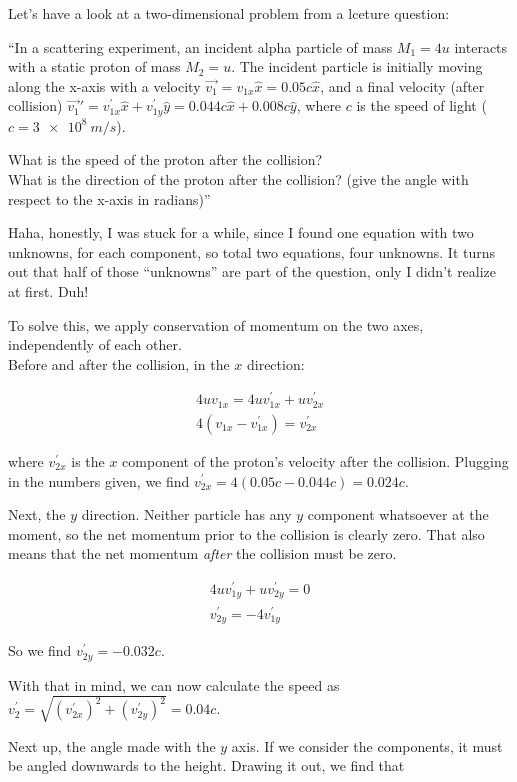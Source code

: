 \documentclass[12pt,a4paper]{report}
\begin{document}
Let's have a look at a two-dimensional problem from a lceture question:

``In a scattering experiment, an incident alpha particle of mass $M_1 = 4u$ interacts with a static proton of mass $M_2 = u$. The incident particle is initially moving along the x-axis with a velocity $\vec{v_1} = v_{1x} \hat{x} = 0.05 c \hat{x}$, and a final velocity (after collision) $\vec{v_1}' = v_{1x}^{'} \hat{x} + v_{1y}^{'} \hat{y} = 0.044 c \hat{x} + 0.008 c \hat{y}$, where $c$ is the speed of light ($c = \SI{3e8}{m/s}$).

What is the speed of the proton after the collision?\\
What is the direction of the proton after the collision? (give the angle with respect to the x-axis in radians)''

Haha, honestly, I was stuck for a while, since I found one equation with two unknowns, for each component, so total two equations, four unknowns. It turns out that half of those ``unknowns'' are part of the question, only I didn't realize at first. Duh!

To solve this, we apply conservation of momentum on the two axes, independently of each other.\\
Before and after the collision, in the $x$ direction:

\begin{align}
4 u v_{1x} = 4 u v_{1x}^{'} + u v_{2x}^{'}\\
4 (v_{1x} - v_{1x}^{'}) = v_{2x}^{'}
\end{align}

where $v_{2x}^{'}$ is the $x$ component of the proton's velocity after the collision. Plugging in the numbers given, we find $v_{2x}^{'} = 4(0.05c - 0.044c) = 0.024c$.

Next, the $y$ direction. Neither particle has any $y$ component whatsoever at the moment, so the net momentum prior to the collision is clearly zero. That also means that the net momentum \emph{after} the collision must be zero.

\begin{align}
4 u v_{1y}^{'} + u v_{2y}^{'} = 0\\
v_{2y}^{'} = -4 v_{1y}^{'}
\end{align}

So we find $v_{2y}^{'} = -0.032c$.

With that in mind, we can now calculate the speed as $v_2^{'} = \sqrt{(v_{2x}^{'})^2 + (v_{2y}^{'})^2} = 0.04c$.

Next up, the angle made with the $y$ axis. If we consider the components, it must be angled downwards to the height. Drawing it out, we find that
\end{document}
